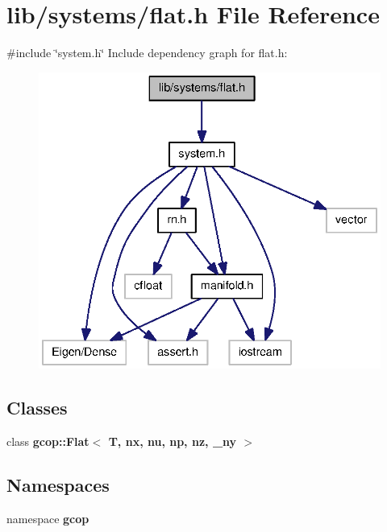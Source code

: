 \section{lib/systems/flat.h \-File \-Reference}
\label{flat_8h}
{\ttfamily \#include \char`\"{}system.\-h\char`\"{}}\*
\-Include dependency graph for flat.\-h\-:
\nopagebreak
\begin{figure}[H]
\begin{center}
\leavevmode
\includegraphics[width=336pt]{flat_8h__incl}
\end{center}
\end{figure}
\subsection*{\-Classes}
\begin{DoxyCompactItemize}
\item 
class {\bf gcop\-::\-Flat$<$ T, nx, nu, np, nz, \-\_\-ny $>$}
\end{DoxyCompactItemize}
\subsection*{\-Namespaces}
\begin{DoxyCompactItemize}
\item 
namespace {\bf gcop}
\end{DoxyCompactItemize}

